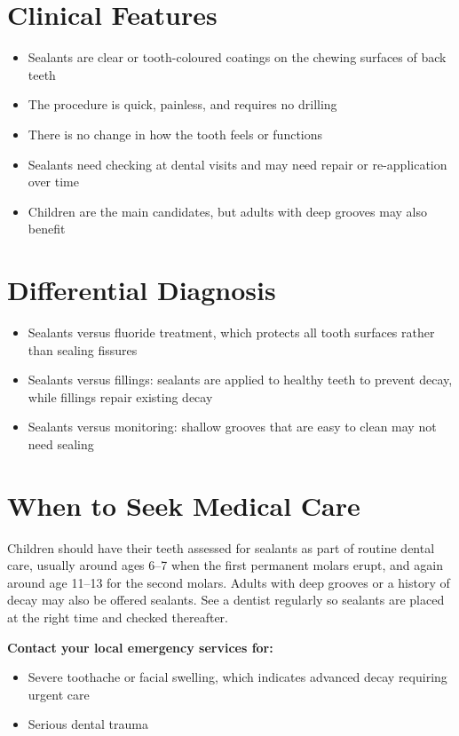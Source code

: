 \section*{Clinical Features}
\begin{itemize}
    \item Sealants are clear or tooth-coloured coatings on the chewing surfaces of back teeth
    \item The procedure is quick, painless, and requires no drilling
    \item There is no change in how the tooth feels or functions
    \item Sealants need checking at dental visits and may need repair or re-application over time
    \item Children are the main candidates, but adults with deep grooves may also benefit
\end{itemize}

\section*{Differential Diagnosis}
\begin{itemize}
    \item Sealants versus fluoride treatment, which protects all tooth surfaces rather than sealing fissures
    \item Sealants versus fillings: sealants are applied to healthy teeth to prevent decay, while fillings repair existing decay
    \item Sealants versus monitoring: shallow grooves that are easy to clean may not need sealing
\end{itemize}

\section*{When to Seek Medical Care}
Children should have their teeth assessed for sealants as part of routine dental care, usually around ages 6--7 when the first permanent molars erupt, and again around age 11--13 for the second molars. Adults with deep grooves or a history of decay may also be offered sealants. See a dentist regularly so sealants are placed at the right time and checked thereafter.

\textbf{Contact your local emergency services for:}
\begin{itemize}
    \item Severe toothache or facial swelling, which indicates advanced decay requiring urgent care
    \item Serious dental trauma
\end{itemize}

